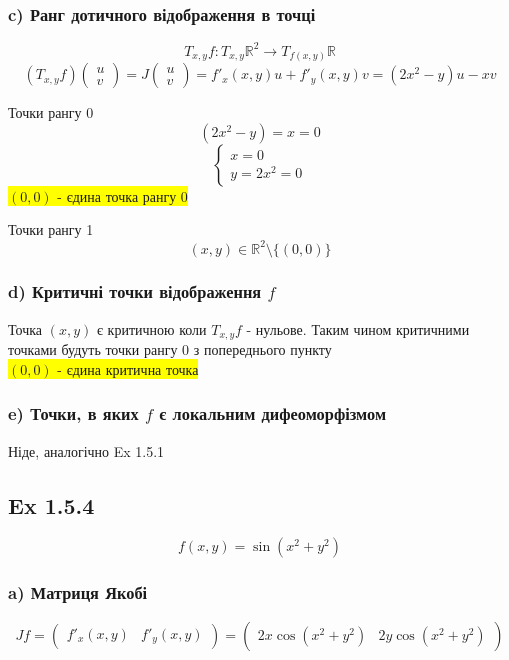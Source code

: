 \documentclass[10pt, a4paper]{article} %
\newcommand{\R}{\mathbb{R}}
\newcommand{\J}{J}
\begin{document}
\subsubsection*{c) Ранг дотичного відображення в точці}
\[T_{x,y} f : T_{x,y}\R^2 \to T_{f(x,y)}\R\]
\[(T_{x,y} f) \begin{pmatrix} u \\ v \end{pmatrix}
= J\begin{pmatrix} u \\ v \end{pmatrix} = f'_x(x,y) u + f'_y(x,y) v = (2x^2-y)u - xv\]

Точки рангу 0
\[(2x^2-y)=x=0\]
\[\begin{cases}
    x = 0\\
    y = 2x^2 = 0
\end{cases}\]
\colorbox{yellow}{$(0,0)$ - єдина точка рангу 0}

Точки рангу 1
\[(x,y) \in \R^2 \setminus \{(0,0)\}\]

\subsubsection*{d) Критичні точки відображення $f$}
Точка $(x,y)$ є критичною коли $T_{x,y}f$ - нульове.
Таким чином критичними точками будуть точки рангу 0 з попереднього пункту\\
\colorbox{yellow}{$(0,0)$ - єдина критична точка}

\subsubsection*{e) Точки, в яких $f$ є локальним дифеоморфізмом}
Ніде, аналогічно Ex 1.5.1


\subsection*{Ex 1.5.4}
\begin{mdframed}
    \[f(x,y) = \sin(x^2+y^2)\]
\end{mdframed}

\subsubsection*{a) Матриця Якобі}
\[\J f = \begin{pmatrix}
    f'_x(x,y) & f'_y(x,y)
\end{pmatrix} = \begin{pmatrix}
    2x\cos(x^2+y^2) & 2y\cos(x^2+y^2)
\end{pmatrix}\]
\end{document}
